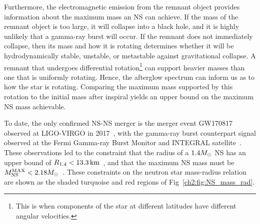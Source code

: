 Furthermore, the electromagnetic emission from the remnant object provides information about the maximum mass an NS can achieve. 
If the mass of the remnant object is too large, it will collapse into a black hole, and it is highly unlikely that a gamma-ray burst will occur. If the remnant does not immediately collapse, then its mass and how it is rotating determines whether it will be hydrodynamically stable, unstable, or metastable against gravitational collapse. A remnant that undergoes differential rotation\footnote{This is when components of the star at different latitudes have different angular velocities.} can support heavier masses than one that is uniformly rotating. Hence, the afterglow spectrum can inform us as to how the star is rotating. Comparing the maximum mass supported by this rotation to the initial mass after inspiral yields an upper bound on the maximum NS mass achievable. 

To date, the only confirmed NS-NS merger is the merger event GW170817 observed at LIGO-VIRGO in 2017~\cite{LIGOScientific:2018cki_oct_GW170817MeasurementsNeutron,LIGOScientific:2018hze_Propertiesbinaryneutron}, with the gamma-ray burst counterpart signal observed at the Fermi Gamma-ray Burst Monitor and INTEGRAL satellite~\cite{LIGOScientific:2017zic_Gravitationalwavesgammarays}. These observations led to the constraint that the radius of a $1.4M_\odot$ NS has an upper bound of $R_{1.4} < 13.3{\rm \,km}$~\cite{LIGOScientific:2018cki_oct_GW170817MeasurementsNeutron, De:2018uhw_aug_TidalDeformabilitiesRadii}, and that the maximum NS mass must be $M_\mathrm{NS}^\mathrm{MAX} < 2.18M_\odot$~\cite{LIGOScientific:2017zic_Gravitationalwavesgammarays}. These constraints on the neutron star mass-radius relation are shown as the shaded turquoise and red regions of Fig~\ref{ch2:fig:NS_mass_rad}. 

